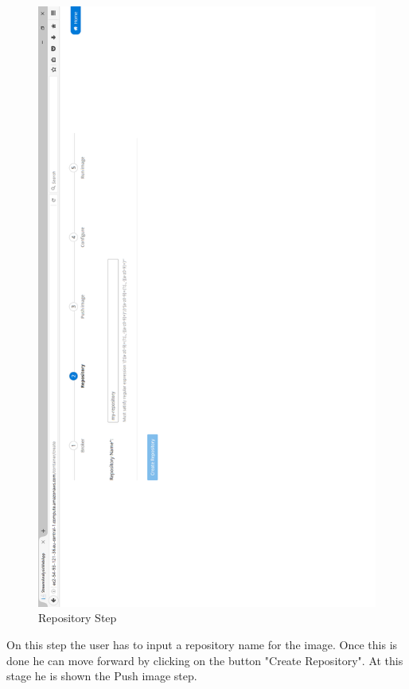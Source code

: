\begin{figure}[p]
	\centering
	\noindent
	\includegraphics[width=0.5\paperwidth]{./images/guide/container/repository.PNG}
	\caption{Repository Step}
	\label{fig:repository}
\end{figure}

On this step the user has to input a repository name for the image. Once this is done he can move forward by clicking on the button "Create Repository". At this stage he is shown the Push image step.

